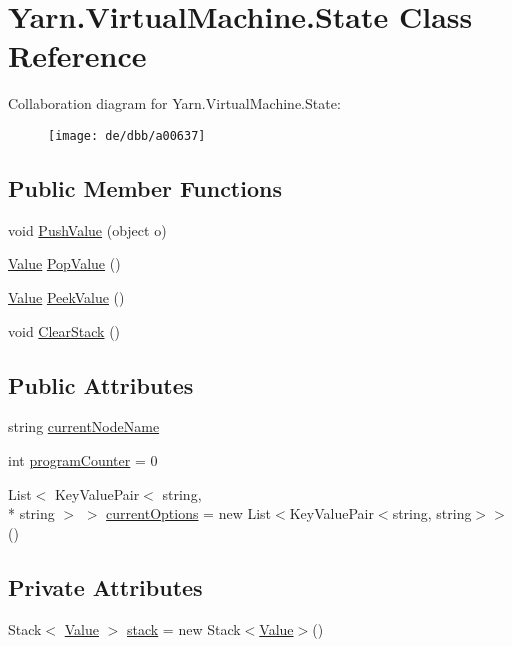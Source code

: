 \hypertarget{a00139}{\section{Yarn.\-Virtual\-Machine.\-State Class Reference}
\label{a00139}
}


Collaboration diagram for Yarn.\-Virtual\-Machine.\-State\-:
\nopagebreak
\begin{figure}[H]
\begin{center}
\leavevmode
\texttt{[image: de/dbb/a00637]}
\end{center}
\end{figure}
\subsection*{Public Member Functions}
\begin{DoxyCompactItemize}
\item 
void \hyperlink{a00139_aace44f5b85b9f746fede834becda4a8e}{Push\-Value} (object o)
\item 
\hyperlink{a00161}{Value} \hyperlink{a00139_a36881a888ea2839d74c3d4e7c199f4ee}{Pop\-Value} ()
\item 
\hyperlink{a00161}{Value} \hyperlink{a00139_a54fd5b64ec94e937e771846167242dc2}{Peek\-Value} ()
\item 
void \hyperlink{a00139_a9c787097fbbbbf1680e4960cda092535}{Clear\-Stack} ()
\end{DoxyCompactItemize}
\subsection*{Public Attributes}
\begin{DoxyCompactItemize}
\item 
string \hyperlink{a00139_a86f481fad527f719b49f8fee6ff79764}{current\-Node\-Name}
\item 
int \hyperlink{a00139_a2c76546b54b4fb573d7f14d79ce230a3}{program\-Counter} = 0
\item 
List$<$ Key\-Value\-Pair$<$ string, \\*
string $>$ $>$ \hyperlink{a00139_ab816dfea32ecda23282700f01454e0a9}{current\-Options} = new List$<$Key\-Value\-Pair$<$string, string$>$$>$()
\end{DoxyCompactItemize}
\subsection*{Private Attributes}
\begin{DoxyCompactItemize}
\item 
Stack$<$ \hyperlink{a00161}{Value} $>$ \hyperlink{a00139_a0bc84abf38b3ff31cbb47363b851c233}{stack} = new Stack$<$\hyperlink{a00161}{Value}$>$()
\end{DoxyCompactItemize}


